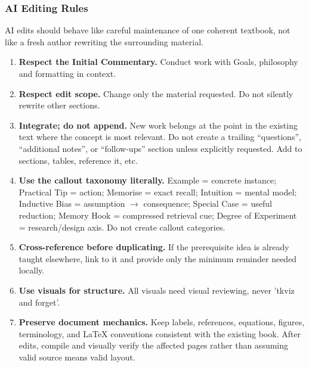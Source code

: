 \subsubsection*{AI Editing Rules}

AI edits should behave like careful maintenance of one coherent textbook, not like a fresh author rewriting the surrounding material.

\begin{enumerate}
    \item \textbf{Respect the Initial Commentary.} Conduct work with Goals, philosophy and formatting in context. 

    \item \textbf{Respect edit scope.} Change only the material requested. 
    Do not silently rewrite other sections.

    \item \textbf{Integrate; do not append.} New work belongs at the point in the existing text where the concept is most relevant. 
    Do not create a trailing ``questions'', ``additional notes'', or ``follow-ups'' section unless explicitly requested.
    Add to sections, tables, reference it, etc.

    \item \textbf{Use the callout taxonomy literally.} Example = concrete instance; Practical Tip = action; Memorise = exact recall; Intuition = mental model; Inductive Bias = assumption $\rightarrow$ consequence; Special Case = useful reduction; Memory Hook = compressed retrieval cue; Degree of Experiment = research/design axis. Do not create callout categories.

    \item \textbf{Cross-reference before duplicating.} If the prerequisite idea is already taught elsewhere, link to it and provide only the minimum reminder needed locally.

    \item \textbf{Use visuals for structure.} All visuals need visual reviewing, never 'tkviz and forget'. 

    \item \textbf{Preserve document mechanics.} Keep labels, references, equations, figures, terminology, and LaTeX conventions consistent with the existing book. 
    After edits, compile and visually verify the affected pages rather than assuming valid source means valid layout.
\end{enumerate}


